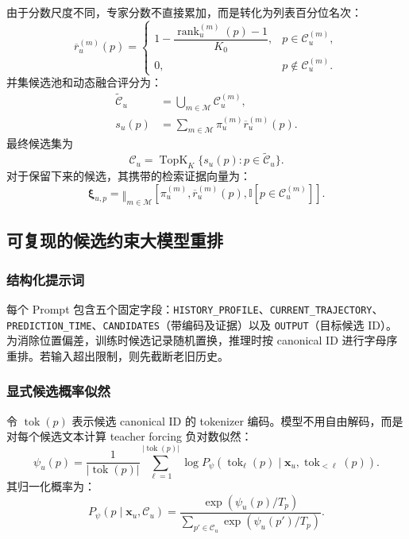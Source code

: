 \documentclass[10pt,fontset=none,twocolumn]{ctexart}
\newcommand{\Experts}{\mathcal{M}}
\newcommand{\Ind}{\mathbb{I}}
\begin{document}
由于分数尺度不同，专家分数不直接累加，而是转化为列表百分位名次：
\begin{equation}
\overline r_{u}^{(m)}(p)
=
\begin{cases}
1-\dfrac{\operatorname{rank}_{u}^{(m)}(p)-1}{K_0},
&
p\in\mathcal{C}_{u}^{(m)},\\[7pt]
0,
&
p\notin\mathcal{C}_{u}^{(m)}.
\end{cases}
\label{eq:rank_percentile}
\end{equation}
并集候选池和动态融合评分为：
\begin{align}
\widetilde{\mathcal{C}}_u
&=
\bigcup_{m\in\Experts}\mathcal{C}_{u}^{(m)},
\label{eq:union_pool}\\
s_u(p)
&=
\sum_{m\in\Experts}
\pi_u^{(m)}\overline r_u^{(m)}(p).
\label{eq:dynamic_fusion}
\end{align}
最终候选集为
\begin{equation}
\mathcal{C}_u
=
\operatorname{TopK}_{K}
\{s_u(p):p\in\widetilde{\mathcal{C}}_u\}.
\label{eq:final_candidate}
\end{equation}
对于保留下来的候选，其携带的检索证据向量为：
\begin{equation}
\bm{\xi}_{u,p}
=
\mathop{\Vert}_{m\in\Experts}
[
\pi_u^{(m)},
\overline r_u^{(m)}(p),
\Ind[p\in\mathcal{C}_u^{(m)}]
].
\label{eq:evidence_vector}
\end{equation}

\subsection{可复现的候选约束大模型重排}
\label{subsec:ranker}

\subsubsection{结构化提示词}

每个 Prompt 包含五个固定字段：\texttt{HISTORY\_PROFILE}、\texttt{CURRENT\_TRAJECTORY}、\texttt{PREDICTION\_TIME}、\texttt{CANDIDATES}（带编码及证据）以及 \texttt{OUTPUT}（目标候选 ID）。为消除位置偏差，训练时候选记录随机置换，推理时按 canonical ID 进行字母序重排。若输入超出限制，则先截断老旧历史。

\subsubsection{显式候选概率似然}

令 $\operatorname{tok}(p)$ 表示候选 canonical ID 的 tokenizer 编码。模型不用自由解码，而是对每个候选文本计算 teacher forcing 负对数似然：
\begin{equation}
\psi_u(p)
=
\frac{1}{\left|\operatorname{tok}(p)\right|}
\sum_{\ell=1}^{|\operatorname{tok}(p)|}
\log
P_{\psi}
\left(
\operatorname{tok}_{\ell}(p)
\mid
\bm{x}_u,
\operatorname{tok}_{<\ell}(p)
\right).
\label{eq:candidate_likelihood}
\end{equation}
其归一化概率为：
\begin{equation}
P_{\psi}(p\mid\bm{x}_u,\mathcal{C}_u)
=
\frac{\exp(\psi_u(p)/T_p)}
{\sum_{p'\in\mathcal{C}_u}\exp(\psi_u(p')/T_p)}.
\label{eq:candidate_probability}
\end{equation}
\end{document}
